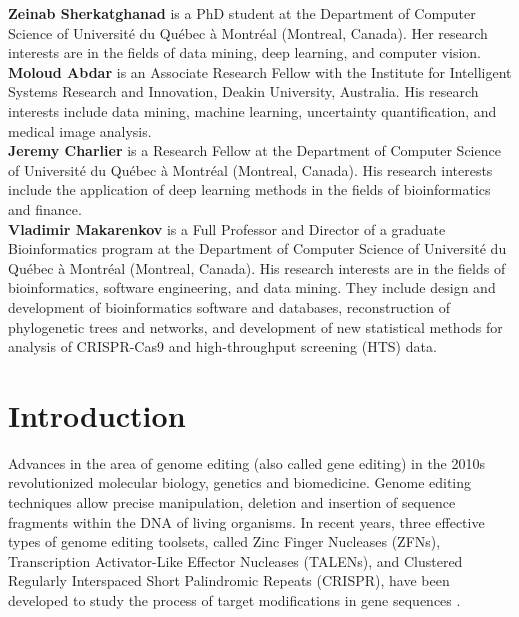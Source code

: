\documentclass[unnumsec,webpdf,contemporary,large]{oup-authoring-template}
\theoremstyle{thmstyleone}%
\theoremstyle{thmstyletwo}%
\theoremstyle{thmstylethree}%
\begin{document}
\textbf{Zeinab Sherkatghanad} is a PhD student at the Department of Computer Science of Université du Québec à Montréal (Montreal, Canada). Her research interests are in the fields of data mining, deep learning, and computer vision.\\
\textbf{Moloud Abdar} is an Associate Research Fellow with the Institute for Intelligent Systems Research and Innovation, Deakin University, Australia. His research interests include data mining, machine learning, uncertainty quantification, and medical image analysis. \\
\textbf{Jeremy Charlier} is a Research Fellow at the Department of Computer Science of Université du Québec à Montréal (Montreal, Canada). His research interests include the application of deep learning methods in the fields of bioinformatics and finance. \\
\textbf{Vladimir Makarenkov} is a Full Professor and Director of a graduate Bioinformatics program at the Department of Computer Science of Université du Québec à Montréal (Montreal, Canada). His research interests are in the fields of bioinformatics, software engineering, and data mining. They include design and development of bioinformatics software and databases, reconstruction of phylogenetic trees and networks, and development of new statistical methods for analysis of CRISPR-Cas9 and high-throughput screening (HTS) data. \\

\section{Introduction}
Advances in the area of genome editing (also called gene editing) in the 2010s revolutionized molecular biology, genetics and biomedicine. Genome editing techniques allow precise manipulation, deletion and insertion of sequence fragments within the DNA of living organisms. In recent years, three effective types of genome editing toolsets, called Zinc Finger Nucleases (ZFNs)\citep{esvelt2013genome}, Transcription Activator-Like Effector Nucleases (TALENs), and Clustered Regularly Interspaced Short Palindromic Repeats (CRISPR), have been developed to study the process of target modifications in gene sequences \citep{esvelt2013genome, puchta2013gene, barrangou2016applications, manghwar2019crispr, bogdanove2018engineering}. 
\end{document}
